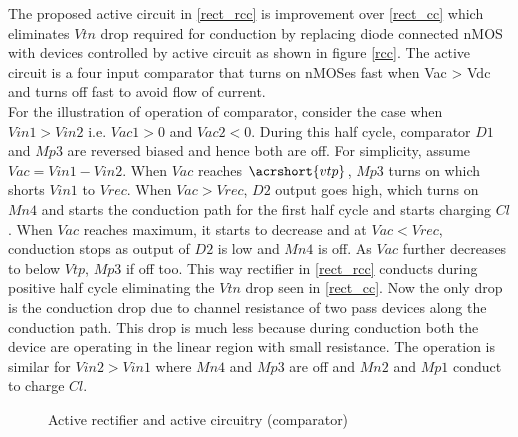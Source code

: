 \documentclass[12pt,a4paper,UKenglish]{article}
\begin{document}
The proposed active circuit in \ref{rect_rcc} is improvement over \ref{rect_cc} which eliminates $Vtn$ drop required for conduction by replacing diode connected nMOS with devices controlled by active circuit as shown in figure \ref{rcc}. The active circuit is a four input comparator that turns on nMOSes fast when Vac > Vdc and turns off fast to avoid flow of current. \\

For the illustration of operation of comparator, consider the case when $Vin1 > Vin2$ i.e. $Vac1 > 0$ and $Vac2 < 0$. During this half cycle, comparator $D1$ and $Mp3$ are reversed biased and hence both are off. For simplicity, assume $Vac =  Vin1 - Vin2$. When $Vac$ reaches $\acrshort{vtp}$, $Mp3$ turns on which shorts $Vin1$ to $Vrec$. When $Vac > Vrec$, $D2$ output goes high, which turns on $Mn4$ and starts the conduction path for the first half cycle and starts charging $Cl$. When $Vac$ reaches maximum, it starts to decrease and at $Vac < Vrec$, conduction stops as output of $D2$ is low and $Mn4$ is off. As $Vac$ further decreases to below $Vtp$, $Mp3$ if off too. This way rectifier in \ref{rect_rcc}  conducts during positive half cycle eliminating the $Vtn$ drop seen in \ref{rect_cc}. Now the only drop is the conduction drop due to channel resistance of two pass devices along the conduction path. This drop is much less because during conduction both the device are operating in the linear region with small resistance. The operation is similar for $Vin2 > Vin1$ where $Mn4$ and $Mp3$ are off and $Mn2$ and $Mp1$ conduct to charge $Cl$. 

\begin{figure} [H]
  \centering 
\hfill
 \caption{Active rectifier and active circuitry (comparator)} 
\label{rect_rcc_rcc} 
\end{figure}
\end{document}
